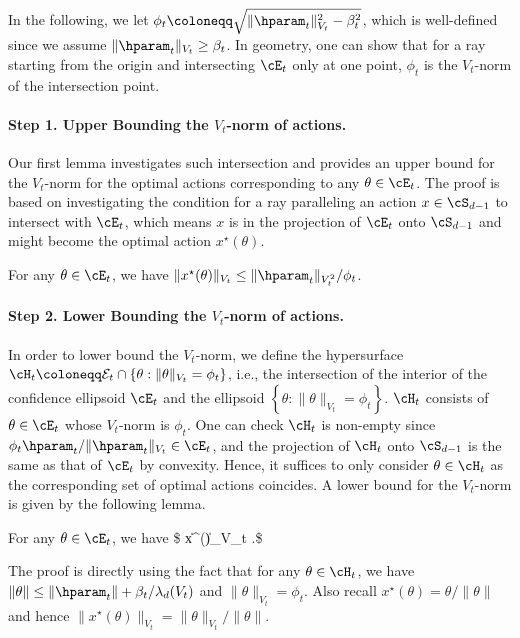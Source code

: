 In the following, we let
$
\phi_t	 \coloneqq \sqrt{ \|\hparam_t\|_{V_t}^2 - \beta_t^2 }
$, which is well-defined since we assume $\|\hparam_t\|_{V_t}  \geq \beta_t$. In geometry,  one can show that for a ray starting from the origin and intersecting $\cE_t$ only at one point, $\phi_t$ is the ${V_t}$-norm of the intersection point. 

\paragraph{Step 1. Upper Bounding the $V_t$-norm of actions.}
Our first lemma investigates such intersection and provides an upper bound for the  $V_t$-norm for the optimal actions corresponding to any $\theta\in \cE_t$. The proof is based on investigating the condition for a ray paralleling an action $x \in \cS_{d-1}$ to intersect with $\cE_t$, which means $x$ is in the projection of $\cE_t$ onto $\cS_{d-1}$ and might become the optimal action $x^\star(\theta)$. 


\begin{lemma}\label{lem:Vt_norm_upper}
For any $\theta\in \cE_t$, we have
	$
	\|x^\star(\theta )\|_{V_t} \leq  \|\hparam_t\|_{V_t^2}/\phi_t$.
\end{lemma}


   



\paragraph{Step 2. Lower Bounding the $V_t$-norm of actions.}

In order to lower bound the $V_t$-norm, we define the hypersurface  
$
\cH_t \coloneqq \mathcal{E}_t\cap\left\{\theta:\|\theta\|_{V_t}=\phi_t\right\}
$, 
i.e., the intersection of the interior of the confidence ellipsoid  $\cE_t$ and the ellipsoid $\left\{\theta:\|\theta\|_{V_t}=\phi_t\right\}$.
$\cH_t$  consists of $\theta \in \cE_t$ whose $V_t$-norm is $\phi_t$. One can check $\cH_t$ is non-empty since $ \phi_t  \hparam_t  /\|\hparam_t\|_{V_t}  \in \cE_t$, and  the projection of $\cH_t$  onto $\cS_{d-1}$ is the same as that of $\cE_t$ by convexity. Hence,  it suffices to only consider  $\theta \in \cH_t$ as the corresponding set of optimal actions coincides. A lower bound for the $V_t$-norm is given by the following lemma.



\begin{lemma}
\label{lem:Vt_norm_lower}
	For any $\theta\in \cE_t$, we have
	\$
	  \|x^\star(\theta )\|_{V_t} \geq {}.\$
\end{lemma}
The proof is directly using the fact that for any $ \theta \in \cH_t$, we have $\|\theta\| \leq \|\hparam_t\| +  \beta_t/\lambda_d(V_t)  $ and $\|\theta\|_{V_t}  =  \phi_t$. Also recall  $x^\star(\theta ) = \theta /\|\theta\|$ and hence $\|x^\star(\theta )\|_{V_t} =  \|\theta\|_{V_t} / \|\theta\|$. 










